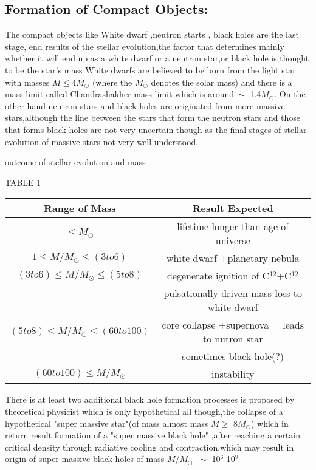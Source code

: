 \documentclass{report}
\begin{document}
\subsection{Formation of Compact Objects:}
  The compact objects like White dwarf ,neutron starts , black holes are the last stage, end results of the stellar evolution,the factor that determines mainly whether it will end up as a white dwarf or a neutron star,or black hole is thought to be the star's mass 
 White dwarfs are believed to be born from the light star with masses $M\le 4M_\odot$ (where the $M_\odot$ denotes the solar mass) and there is a mass limit called Chandrashakher mass limit which is around$~\sim$ 1.4$M_\odot$.
\newline
  On the other hand neutron stars and black holes are originated from more massive stars,although the line between the stars that form the neutron stars and those that forms black holes are not very uncertain though as the final stages of stellar evolution of massive stars not very  well understood.
\newline
\begin{center}
\centering
{
outcome of stellar evolution and mass
}
\end{center}
\begin{center}
\centering
{
TABLE 1
}
\end{center}
\begin{center}
\begin{tabular}{|c|c|}
\hline 
Range of Mass & Result Expected\\
\hline
\hline
$\le M_\odot$ & lifetime longer than age of universe\\
\hline
$1\le M/M_\odot \le ( 3 to 6)$ & white dwarf +planetary nebula\\

\hline
$(3 to 6)\le  M/M_\odot \le  (5 to 8)$ & degenerate ignition of C$^{12}$+C$^{12}$ \\

& pulsationally driven mass loss to white dwarf\\
\hline
$(5 to 8)\le M/M_\odot \le (60 to 100)$& core collapse +supernova = leads to nutron star\\
&sometimes black hole(?)\\
\hline
$(60 to 100) \le M/M_\odot$ & instability\\
\hline
\end{tabular}
\end{center}
	There is at least two additional black hole formation processes is proposed by theoretical physicist which is only hypothetical all though,the collapse of a hypothetical "super massive star"(of mass almost mass $M \geq$ $8M_\odot$)  which in return result formation of a "super massive black hole" ,after reaching a certain critical density through radiative cooling and contraction,which may result in origin of super massive black holes of mass $M$/$M_\odot$ $~\sim$ 10$^6$-10$^9$
\end{document}
